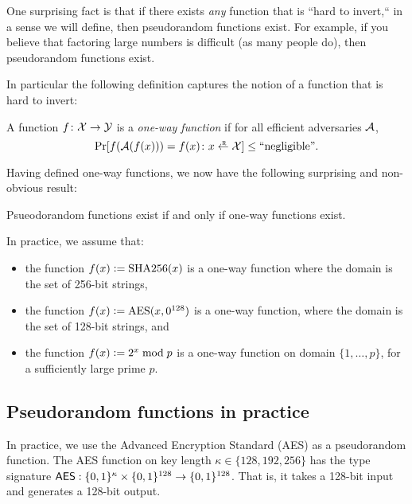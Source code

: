 One surprising fact is that if there exists \emph{any} function that
is ``hard to invert,`` in a sense we will define, then pseudorandom
functions exist.
For example, if you believe that factoring large numbers is difficult
(as many people do), then pseudorandom functions exist.

In particular the following definition captures the notion of a
function that is hard to invert:
\begin{definition}\label{def:owf}
A function $f \colon \mathcal{X} \to \mathcal{Y}$ is a \emph{one-way function} if
for all efficient adversaries $\mathcal{A}$, 
\[ \Pr[f(\calA(f(x))) = f(x) \colon x \getsr \calX ] \leq \text{``negligible''}.\]
\end{definition}

Having defined one-way functions, we now have the following surprising and
non-obvious result:
\begin{theorem}
Psueodorandom functions exist if and only if one-way functions exist.
\autocite{HILL99}
\end{theorem}

In practice, we assume that:
\begin{itemize}
  \item the function $f(x) \mathrel{\mathop:}= \text{SHA256}(x)$ is a one-way function
    where the domain is the set of 256-bit strings,
  \item the function $f(x) \mathrel{\mathop:}= \text{AES}(x, 0^{128})$ is a one-way function,
    where the domain is the set of 128-bit strings, and
  \item the function $f(x) \mathrel{\mathop:}= 2^x \bmod p$ is a one-way function
    on domain $\{1, \dots, p\}$, for a sufficiently large prime $p$.
\end{itemize}

\subsection{Pseudorandom functions in practice}

In practice, we use the Advanced Encryption
Standard (AES) as a pseudorandom function.
The AES function on key length $\kappa \in \{128, 192, 256\}$
has the type signature
$\mathsf{AES}: \{0,1\}^\kappa \times \{0,1\}^{128} \rightarrow \{0,1\}^{128}$.
That is, it takes a 128-bit input and generates a 128-bit output.

